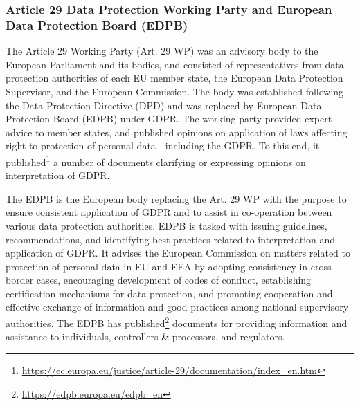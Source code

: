 \subsubsection{Article 29 Data Protection Working Party and European Data Protection Board (EDPB)}
The Article 29 Working Party (Art. 29 WP) was an advisory body to the European Parliament and its bodies, and consisted of representatives from data protection authorities of each EU member state, the European Data Protection Supervisor, and the European Commission. 
The body was established following the Data Protection Directive (DPD) and was replaced by European Data Protection Board (EDPB) under GDPR. 
The working party provided expert advice to member states, and published opinions on application of laws affecting right to protection of personal data - including the GDPR.
To this end, it published\footnote{\url{https://ec.europa.eu/justice/article-29/documentation/index_en.htm}} a number of documents clarifying or expressing opinions on interpretation of GDPR.

The EDPB is the European body replacing the Art. 29 WP with the purpose to ensure consistent application of GDPR and to assist in co-operation between various data protection authorities. 
EDPB is tasked with issuing guidelines, recommendations, and identifying best practices related to interpretation and application of GDPR.
It advises the European Commission on matters related to protection of personal data in EU and EEA by adopting consistency in cross-border cases, encouraging development of codes of conduct, establishing certification mechanisms for data protection, and promoting cooperation and effective exchange of information and good practices among national supervisory authorities. 
The EDPB has published\footnote{\url{https://edpb.europa.eu/edpb_en}} documents for providing information and assistance to individuals, controllers \& processors, and regulators.


